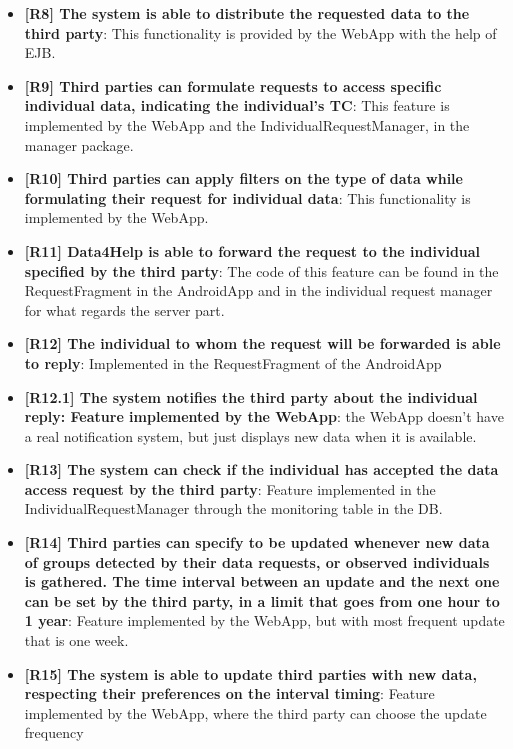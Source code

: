 \begin{itemize}
\item \textbf{[R8] The system is able to distribute the requested data to the third party}: This functionality is provided by the WebApp with the help of EJB.

\item \textbf{[R9] Third parties can formulate requests to access specific individual data,
indicating the individual's TC}: This feature is implemented by the WebApp and the IndividualRequestManager, in the manager package.

\item \textbf{[R10] Third parties can apply filters on the type of data while formulating their
request for individual data}: This functionality is implemented by the WebApp.

\item \textbf{[R11] Data4Help is able to forward the request to the individual specified by
the third party}: The code of this feature can be found in the RequestFragment in the AndroidApp and in the individual request manager for what regards the server part.

\item \textbf{[R12] The individual to whom the request will be forwarded is able to reply}: Implemented in the RequestFragment of the AndroidApp

\item \textbf{[R12.1] The system notifies the third party about the individual reply: Feature implemented by the WebApp}: the WebApp doesn't have a real notification system, but just displays new data when it is available.

\item \textbf{[R13] The system can check if the individual has accepted the data access
request by the third party}: Feature implemented in the IndividualRequestManager through the monitoring table in the DB.

\item \textbf{[R14] Third parties can specify to be updated whenever new data of groups detected by their data requests, or observed individuals is gathered. The time interval between an update and the next one can be set by the third party, in a limit that goes from one hour to 1 year}: Feature implemented by the WebApp, but with most frequent update that is one week.

\item \textbf{[R15] The system is able to update third parties with new data, respecting their
preferences on the interval timing}: Feature implemented by the WebApp, where the third party can choose the update frequency


\end{itemize}
